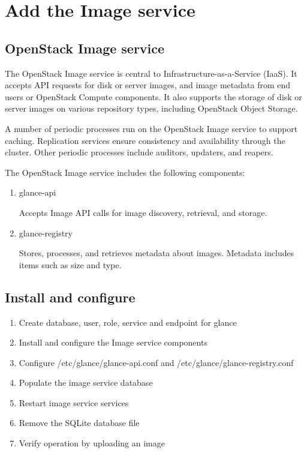 \section{Add the Image service}
    \subsection{OpenStack Image service}
    \par The OpenStack Image service is central to Infrastructure-as-a-Service (IaaS). It accepts API requests for disk or server images, and image metadata from end users or OpenStack Compute components. It also supports the storage of disk or server images on various repository types, including OpenStack Object Storage.

    \par A number of periodic processes run on the OpenStack Image service to support caching. Replication services ensure consistency and availability through the cluster. Other periodic processes include auditors, updaters, and reapers.
    
    \par The OpenStack Image service includes the following components:
    
    \begin{enumerate}
    \item glance-api
    \par Accepts Image API calls for image discovery, retrieval, and storage.
    
    \item glance-registry
    \par Stores, processes, and retrieves metadata about images. Metadata includes items such as size and type.
    \end{enumerate}
    
    \subsection{Install and configure}
        \begin{enumerate}
            \item Create database, user, role, service and endpoint for glance
            \item Install and configure the Image service components
            \item Configure /etc/glance/glance-api.conf and /etc/glance/glance-registry.conf
            \item Populate the image service database
            \item Restart image service services
            \item Remove the SQLite database file
            \item Verify operation by uploading an image
        \end{enumerate}



